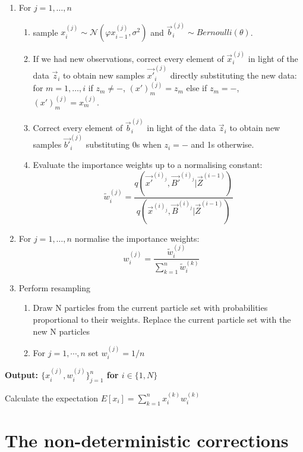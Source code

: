 \begin{algorithm}[H]
\begin{algorithmic}
\begin{enumerate}
	\item For $j = 1, \dots , n$
	\begin{enumerate}
  		\item sample $x_{i}^{(j)} \sim \mathcal{N} (\varphi x_{i-1}^{(j)}, \sigma^{2})$ and $\vec{b}_i^{(j)} \sim Bernoulli(\theta)$.
		\item {If we had new observations, correct every element of $\vec{x}_{i}^{(j)}$ in light of the data $\vec{z}_{i}$ to obtain new samples $\vec{x'}_{i}^{(j)}$ directly substituting the new data: for $m = 1, \dots ,i$ if $z_{m} \neq -$, $(x')_m^{(j)} = z_{m}$ else if $z_{m} = -$, $(x')_m^{(j)} = x_m^{(j)}$.}
		\item {Correct every element of $\vec{b}_{i}^{(j)}$ in light of the data $\vec{z}_{i}$ to obtain new samples $\vec{b'}_{i}^{(j)}$ substituting 0s when $z_i = -$ and 1s otherwise.}
		\item Evaluate the importance weights up to a normalising constant:
		\[
		\tilde{w}^{(j)}_{i} = \frac{q(\vec{x'}^{(i)_j}, \vec{B'}^{(i)_j} | \vec{Z}^{(i-1)})}{q(\vec{x}^{(i)_j}, \vec{B}^{(i)_j} | \vec{Z}^{(i-1)})}
		\]
	\end{enumerate}
	\item For $j = 1, \dots , n$ normalise the importance weights:
	\[
	w^{(j)}_{i} = \frac{\tilde{w}^{(j)}_{i}}{\sum_{k=1}^{n}\tilde{w}^{(k)}_{i}}
	\]
	\item Perform resampling
	\begin{enumerate}
	    \item Draw N particles from the current particle set with probabilities proportional to their weights. Replace the current particle set with the new N particles
	    \item For $j=1,\cdots ,n$ set $w_{i}^{(j)}=1/n$
	\end{enumerate}
	

\end{enumerate}

\State  \bf{Output:} \normalfont $\Big \{ x_{i}^{(j)} , w_{i}^{(j)} \Big \}_{j = 1}^{n}$ for $i \in \{ 1, N \}$

\item Calculate the expectation  $E[x_i] = \sum_{k=1}^{n} x^{(k)}_i w_{i}^{(k)}$
  
 \end{algorithmic}
\end{algorithm}

\section{The non-deterministic corrections}

